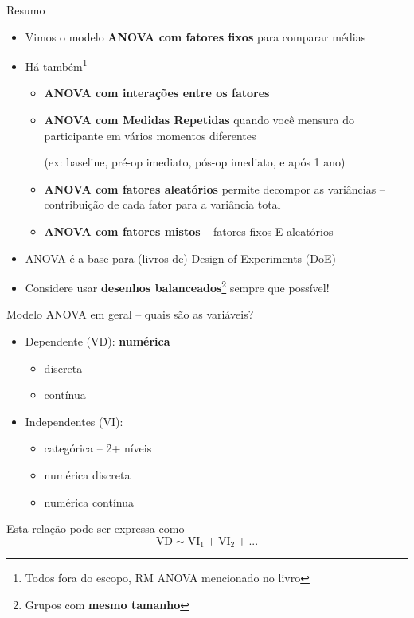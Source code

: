 \documentclass{beamer}
\begin{document}
\begin{frame}{\scriptsize Resumo}
  \begin{itemize}
    \footnotesize
  \item Vimos o modelo {\bf ANOVA com fatores fixos} para comparar médias
    \bigskip
  \item Há também\footnote{\scriptsize Todos fora do escopo, RM ANOVA mencionado no livro}
    \begin{itemize}
      \scriptsize
    \item<2-> {\bf ANOVA com interações entre os fatores}
    \item<2-> {\bf ANOVA com Medidas Repetidas} quando você mensura do participante em vários momentos diferentes

      (ex: baseline, pré-op imediato, pós-op imediato, e após 1 ano)
    \item<2-> {\bf ANOVA com fatores aleatórios} permite decompor as variâncias -- contribuição de cada fator para a variância total
    \item<2-> {\bf ANOVA com fatores mistos} -- fatores fixos E aleatórios
    \end{itemize}
    \bigskip
  \item<2-> ANOVA é a base para (livros de) Design of Experiments (DoE)
    \bigskip
  \item<2-> Considere usar {\bf desenhos balanceados}\footnote{Grupos com {\bf mesmo tamanho}} sempre que possível!
  \end{itemize}
\end{frame}

\begin{frame}{\scriptsize Modelo ANOVA em geral -- quais são as variáveis?}
  \begin{itemize}
    \footnotesize
  \item Dependente (VD): {\bf numérica}
    \begin{itemize}
      \scriptsize
    \item discreta
    \item contínua
    \end{itemize}
  \item Independentes (VI):
    \begin{itemize}
      \scriptsize
    \item categórica -- 2+ níveis
    \item numérica discreta
    \item numérica contínua
    \end{itemize}
  \end{itemize}
  \vfill
  \begin{block}{Esta relação pode ser expressa como}
    \begin{displaymath}
      \text{VD} \sim \text{VI}_1 + \text{VI}_2 +...
    \end{displaymath}
  \end{block}
\end{frame}
\end{document}
